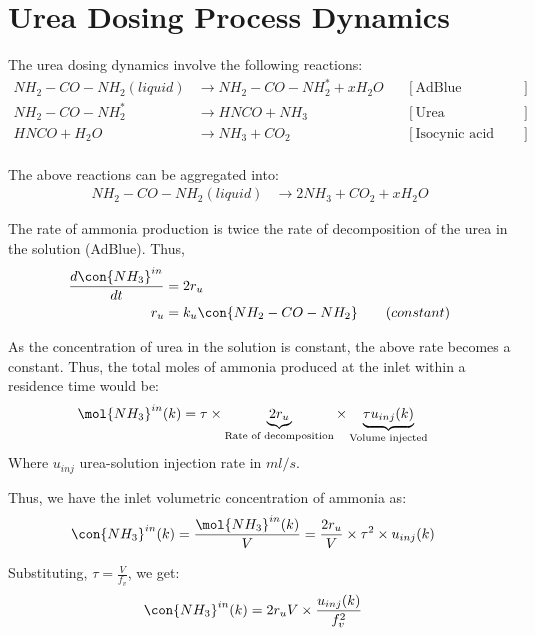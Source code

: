 \newpage
\section{Urea Dosing Process Dynamics}
The urea dosing dynamics involve the following reactions:
\begin{align*}
    NH_2 - CO - NH_2 (liquid) &\longrightarrow NH_2 - CO - NH_2^* + x H_2 O
                & &[\text{AdBlue evaporation}] \\
    NH_2 - CO - NH_2^*  &\longrightarrow  HNCO + NH_3
                & &[\text{Urea decomposition}] \\
    HNCO + H_2O &\longrightarrow NH_3 + CO_2
                & &[\text{Isocynic acid hydrolysis}] \\
\end{align*}

The above reactions can be aggregated into:
\begin{align*}
    NH_2 - CO - NH_2 (liquid) &\longrightarrow 2 NH_3 + CO_2 + x H_2 O
\end{align*}

The rate of ammonia production is twice the rate of decomposition of the urea in the solution (AdBlue). Thus,
\begin{align*}
    \frac{d \con{NH_3}^{in}}{dt} &= 2 r_{u}\\
    r_{u} &= k_{u} \con{NH_2 - CO - NH_2} \qquad (constant)
\end{align*}

As the concentration of urea in the solution is constant, the above rate becomes a constant. Thus, the total moles of
ammonia produced at the inlet within a residence time would be:
\begin{align*}
    \mol{NH_3}^{in} (k) &= \tau \times \underbrace{2 r_{u}}_{\text{Rate of decomposition}} \times \underbrace{\tau u_{inj} (k)}_{\text{Volume injected}}
\end{align*}
Where $u_{inj}$ urea-solution injection rate in $ml/s$.

Thus, we have the inlet volumetric concentration of ammonia as:
\begin{align*}
    \con{NH_3}^{in} (k) &= \frac{\mol{NH_3}^{in} (k)}{V}
                          = \frac{2 r_u}{V} \times \tau^2 \times u_{inj} (k)
\end{align*}

Substituting, $\tau = \frac{V}{f_v}$, we get:
\begin{align}
    \con{NH_3}^{in} (k) &= 2r_u V \times \frac{u_{inj}(k)}{f_v^2}
\end{align}
